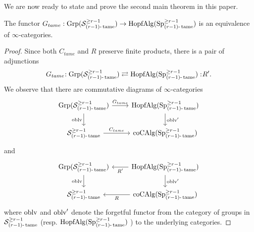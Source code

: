 We are now ready to state and prove the second main theorem in this paper.
\begin{theorem}
	The functor $G_{tame}: \operatorname{Grp}({\mathcal{S}}^{\geq r-1}_{(r-1)\text{-}\operatorname{\operatorname{tame}}})\to \operatorname{HopfAlg}(\operatorname{Sp}^{\geq r-1}_{(r-1)\text{-}\operatorname{\operatorname{tame}}})$ is an equivalence of $\infty$-categories.
\end{theorem}
\begin{proof}
Since both $C_{tame}$ and $R$ preserve finite products, there is a pair of adjunctions
\begin{equation}
\label{adj on grps}
	G_{tame}\negmedspace: \operatorname{Grp}({\mathcal{S}}^{\geq r-1}_{(r-1)\text{-}\operatorname{\operatorname{tame}}})\rightleftarrows \operatorname{HopfAlg}(\operatorname{Sp}^{\geq r-1}_{(r-1)\text{-}\operatorname{\operatorname{tame}}}):\negmedspace R'.
\end{equation}
We observe that there are commutative diagrams of $\infty$-categories
\[
\begin{tikzcd}
	\Grp(\CS^{\geq r-1}_{(r-1)\text{-}\tame}) & \Hopfalgebra(\Sp^{\geq r-1}_{(r-1)\text{-}\tame})\\
	\CS^{\geq r-1}_{(r-1)\text{-}\tame}  & 
	\coCAlg(\Sp^{\geq r-1}_{(r-1)\text{-}\tame})
	\arrow[from=1-1, to= 1-2, "G_{tame}"]
	\arrow[from=1-1, to=2-1, "\oblv" left]
	\arrow[from=1-2, to=2-2, "\oblv'" ]
	\arrow[from=2-1, to= 2-2, "C_{tame}"]
\end{tikzcd}
\]
and 
\[
\begin{tikzcd}
	\Grp(\CS^{\geq r-1}_{(r-1)\text{-}\tame}) & \Hopfalgebra(\Sp^{\geq r-1}_{(r-1)\text{-}\tame})\\
	\CS^{\geq r-1}_{(r-1)\text{-}\tame}  & 
	\coCAlg(\Sp^{\geq r-1}_{(r-1)\text{-}\tame})
	\arrow[from=1-2, to= 1-1, "R'"]
	\arrow[from=1-1, to=2-1, "\oblv" left]
	\arrow[from=1-2, to=2-2, "\oblv'" ]
	\arrow[from=2-2, to= 2-1, "R"]
\end{tikzcd}
\]
where $\operatorname{oblv}$ and $\operatorname{oblv}'$ denote the forgetful functor from the category of groups in ${\mathcal{S}}^{\geq r-1}_{(r-1)\text{-}\operatorname{\operatorname{tame}}}$ (resp. $\operatorname{HopfAlg}(\operatorname{Sp}^{\geq r-1}_{(r-1)\text{-}\operatorname{\operatorname{tame}}})$ ) to the underlying categories.


\end{proof}
